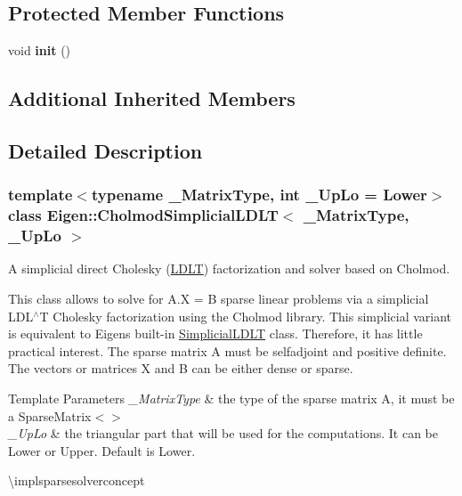 \subsection*{Protected Member Functions}
\begin{DoxyCompactItemize}
\item 
\mbox{\label{class_eigen_1_1_cholmod_simplicial_l_d_l_t_a368110df5fb61cbebbce2c43bcc8faa7}} 
void {\bfseries init} ()
\end{DoxyCompactItemize}
\subsection*{Additional Inherited Members}


\subsection{Detailed Description}
\subsubsection*{template$<$typename \+\_\+\+Matrix\+Type, int \+\_\+\+Up\+Lo = Lower$>$\newline
class Eigen\+::\+Cholmod\+Simplicial\+L\+D\+L\+T$<$ \+\_\+\+Matrix\+Type, \+\_\+\+Up\+Lo $>$}

A simplicial direct Cholesky (\mbox{\hyperlink{class_eigen_1_1_l_d_l_t}{L\+D\+LT}}) factorization and solver based on Cholmod. 

This class allows to solve for A.\+X = B sparse linear problems via a simplicial L\+D\+L$^\wedge$T Cholesky factorization using the Cholmod library. This simplicial variant is equivalent to Eigen\textquotesingle{}s built-\/in \mbox{\hyperlink{class_eigen_1_1_simplicial_l_d_l_t}{Simplicial\+L\+D\+LT}} class. Therefore, it has little practical interest. The sparse matrix A must be selfadjoint and positive definite. The vectors or matrices X and B can be either dense or sparse.


\begin{DoxyTemplParams}{Template Parameters}
{\em \+\_\+\+Matrix\+Type} & the type of the sparse matrix A, it must be a Sparse\+Matrix$<$$>$ \\
\hline
{\em \+\_\+\+Up\+Lo} & the triangular part that will be used for the computations. It can be Lower or Upper. Default is Lower.\\
\hline
\end{DoxyTemplParams}
\textbackslash{}implsparsesolverconcept

